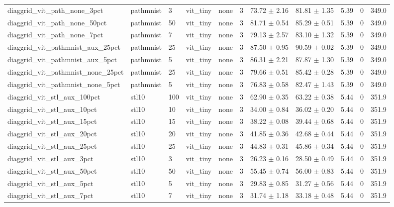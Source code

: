\begin{tabular}{lllllllllll}
diaggrid_vit_path_none_3pct & pathmnist & 3 & vit_tiny & none & 3 & 73.72 $\pm$ 2.16 & 81.81 $\pm$ 1.35 & 5.39 & 0 & 349.0 \\
diaggrid_vit_path_none_50pct & pathmnist & 50 & vit_tiny & none & 3 & 81.71 $\pm$ 0.54 & 85.29 $\pm$ 0.51 & 5.39 & 0 & 349.0 \\
diaggrid_vit_path_none_7pct & pathmnist & 7 & vit_tiny & none & 3 & 79.13 $\pm$ 2.57 & 83.10 $\pm$ 1.32 & 5.39 & 0 & 349.0 \\
diaggrid_vit_pathmnist_aux_25pct & pathmnist & 25 & vit_tiny & none & 3 & 87.50 $\pm$ 0.95 & 90.59 $\pm$ 0.02 & 5.39 & 0 & 349.0 \\
diaggrid_vit_pathmnist_aux_5pct & pathmnist & 5 & vit_tiny & none & 3 & 86.31 $\pm$ 2.21 & 87.87 $\pm$ 1.30 & 5.39 & 0 & 349.0 \\
diaggrid_vit_pathmnist_none_25pct & pathmnist & 25 & vit_tiny & none & 3 & 79.66 $\pm$ 0.51 & 85.42 $\pm$ 0.28 & 5.39 & 0 & 349.0 \\
diaggrid_vit_pathmnist_none_5pct & pathmnist & 5 & vit_tiny & none & 3 & 76.83 $\pm$ 0.58 & 82.47 $\pm$ 1.43 & 5.39 & 0 & 349.0 \\
diaggrid_vit_stl_aux_100pct & stl10 & 100 & vit_tiny & none & 3 & 62.90 $\pm$ 0.35 & 63.22 $\pm$ 0.38 & 5.44 & 0 & 351.9 \\
diaggrid_vit_stl_aux_10pct & stl10 & 10 & vit_tiny & none & 3 & 34.00 $\pm$ 0.84 & 36.02 $\pm$ 0.20 & 5.44 & 0 & 351.9 \\
diaggrid_vit_stl_aux_15pct & stl10 & 15 & vit_tiny & none & 3 & 38.22 $\pm$ 0.08 & 39.44 $\pm$ 0.68 & 5.44 & 0 & 351.9 \\
diaggrid_vit_stl_aux_20pct & stl10 & 20 & vit_tiny & none & 3 & 41.85 $\pm$ 0.36 & 42.68 $\pm$ 0.44 & 5.44 & 0 & 351.9 \\
diaggrid_vit_stl_aux_25pct & stl10 & 25 & vit_tiny & none & 3 & 44.83 $\pm$ 0.31 & 45.86 $\pm$ 0.34 & 5.44 & 0 & 351.9 \\
diaggrid_vit_stl_aux_3pct & stl10 & 3 & vit_tiny & none & 3 & 26.23 $\pm$ 0.16 & 28.50 $\pm$ 0.49 & 5.44 & 0 & 351.9 \\
diaggrid_vit_stl_aux_50pct & stl10 & 50 & vit_tiny & none & 3 & 55.45 $\pm$ 0.74 & 56.00 $\pm$ 0.83 & 5.44 & 0 & 351.9 \\
diaggrid_vit_stl_aux_5pct & stl10 & 5 & vit_tiny & none & 3 & 29.83 $\pm$ 0.85 & 31.27 $\pm$ 0.56 & 5.44 & 0 & 351.9 \\
diaggrid_vit_stl_aux_7pct & stl10 & 7 & vit_tiny & none & 3 & 31.74 $\pm$ 1.18 & 33.18 $\pm$ 0.48 & 5.44 & 0 & 351.9 \\

\end{tabular}
